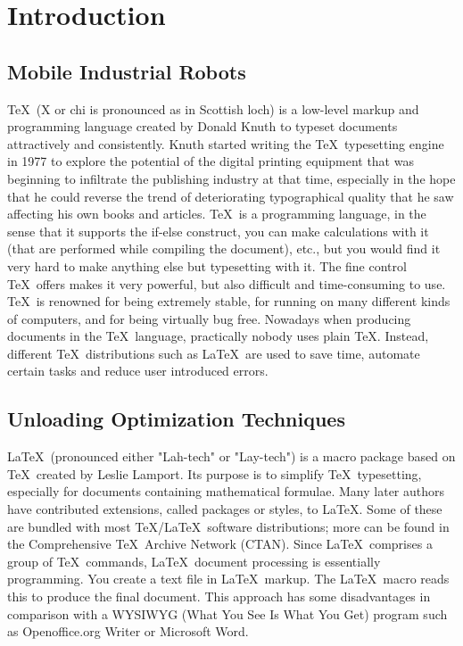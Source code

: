 %
%
%
%

\chapter{Introduction}





\section{Mobile Industrial Robots}
\label{sec:TopicDescription}

\TeX\ (X or chi is pronounced as in Scottish loch) is a low-level markup and programming language created by Donald Knuth to typeset documents attractively and consistently.
Knuth started writing the \TeX\ typesetting engine in 1977 to explore the potential of the digital printing equipment that was beginning to infiltrate the publishing industry at that time, especially in the hope that he could reverse the trend of deteriorating typographical quality that he saw affecting his own books and articles.
\TeX\ is a programming language, in the sense that it supports the if-else construct, you can make calculations with it (that are performed while compiling the document), etc., but you would find it very hard to make anything else but typesetting with it. The fine control \TeX\ offers makes it very powerful, but also difficult and time-consuming to use. \TeX\ is renowned for being extremely stable, for running on many different kinds of computers, and for being virtually bug free.
Nowadays when producing documents in the \TeX\ language, practically nobody uses plain \TeX. Instead, different \TeX\ distributions such as \LaTeX\ are used to save time, automate certain tasks and reduce user introduced errors.


\section{Unloading Optimization Techniques}
\label{sec:Thoughts}

\LaTeX\ (pronounced either "Lah-tech" or "Lay-tech") is a macro package based on \TeX\ created by Leslie Lamport. Its purpose is to simplify \TeX\ typesetting, especially for documents containing mathematical formulae.
Many later authors have contributed extensions, called packages or styles, to \LaTeX. Some of these are bundled with most \TeX/\LaTeX\ software distributions; more can be found in the Comprehensive \TeX\ Archive Network (CTAN).
Since \LaTeX\ comprises a group of \TeX\ commands, \LaTeX\ document processing is essentially programming. You create a text file in \LaTeX\ markup. The \LaTeX\ macro reads this to produce the final document.
This approach has some disadvantages in comparison with a WYSIWYG (What You See Is What You Get) program such as Openoffice.org Writer or Microsoft Word.

